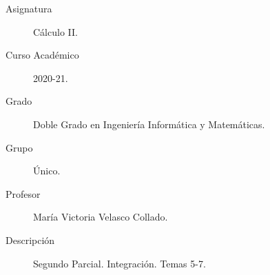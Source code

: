 \documentclass[12pt]{article}
\begin{document}

    
    

    \begin{description}
        \item[Asignatura] Cálculo II.
        \item[Curso Académico] 2020-21.
        \item[Grado] Doble Grado en Ingeniería Informática y Matemáticas.
        \item[Grupo] Único.
        \item[Profesor] María Victoria Velasco Collado.
        \item[Descripción] Segundo Parcial. Integración. Temas 5-7.
    
    \end{description}
    \newpage
    
\end{document}

